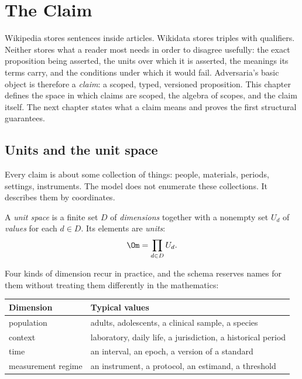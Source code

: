 \chapter{The Claim}\label{ch:claim}

Wikipedia stores sentences inside articles. Wikidata stores triples with qualifiers. Neither stores what a reader most needs in order to disagree usefully: the exact proposition being asserted, the units over which it is asserted, the meanings its terms carry, and the conditions under which it would fail. Adversaria's basic object is therefore a \emph{claim}: a scoped, typed, versioned proposition. This chapter defines the space in which claims are scoped, the algebra of scopes, and the claim itself. The next chapter states what a claim means and proves the first structural guarantees.

\section{Units and the unit space}

Every claim is about some collection of things: people, materials, periods, settings, instruments. The model does not enumerate these collections. It describes them by coordinates.

\begin{definition}\label{def:unitspace}
A \emph{unit space} is a finite set $D$ of \emph{dimensions} together with a nonempty set $U_d$ of \emph{values} for each $d\in D$. Its elements are \emph{units}:
\[
\Om=\prod_{d\in D}U_d .
\]
\end{definition}

Four kinds of dimension recur in practice, and the schema reserves names for them without treating them differently in the mathematics:

\begin{center}
\begin{tabularx}{\textwidth}{@{}lX@{}}
\toprule
Dimension & Typical values\\
\midrule
population & adults, adolescents, a clinical sample, a species\\
context & laboratory, daily life, a jurisdiction, a historical period\\
time & an interval, an epoch, a version of a standard\\
measurement regime & an instrument, a protocol, an estimand, a threshold\\
\bottomrule
\end{tabularx}
\end{center}


